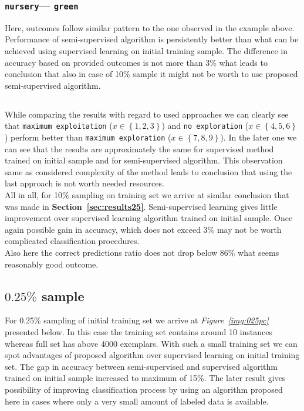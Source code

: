 \documentclass[12pt, a4paper, pdflatex]{report}
\begin{document}
\subsubsection{\texttt{nursery}--- \texttt{green}}
Here, outcomes follow similar pattern to the one observed in the example above. Performance of semi-supervised algorithm is persistently better than what can be achieved using supervised learning on initial training sample. The difference in accuracy based on provided outcomes is not more than 3\% what leads to conclusion that also in case of 10\% sample it might not be worth to use proposed semi-supervised algorithm.

\subsection*{}
While comparing the results with regard to used approaches we can clearly see that \texttt{maximum exploitation} ($x \in \left \{ 1, 2, 3 \right \}$) and \texttt{no exploration} ($x \in \left \{ 4, 5, 6 \right \}$) perform better than \texttt{maximum exploration} ($x \in \left \{ 7, 8, 9 \right \}$). In the later one we can see that the results are approximately the same for supervised method trained on initial sample and for semi-supervised algorithm. This observation same as considered complexity of the method leads to conclusion that using the last approach is not worth needed resources.\\

All in all, for 10\% sampling on training set we arrive at similar conclusion that was made in \textbf{Section~\ref{sec:results25}}. Semi-supervised learning gives little improvement over supervised learning algorithm trained on initial sample. Once again possible gain in accuracy, which does not exceed 3\% may not be worth complicated classification procedures.\\
Also here the correct predictions ratio does not drop below 86\% what seems reasonably good outcome.


\subsection{$\mathbf{0.25\%}$ sample~\cite{results025}\label{sec:results025}}
For 0.25\% sampling of initial training set we arrive at \emph{Figure~\ref{img:025pc}} presented below. In this case the training set contains around 10 instances whereas full set has above 4000 exemplars. With such a small training set we can spot advantages of proposed algorithm over supervised learning on initial training set. The gap in accuracy between semi-supervised and supervised algorithm trained on initial sample increased to maximum of 15\%. The later result gives possibility of improving classification process by using an algorithm proposed here in cases where only a very small amount of labeled data is available.
\end{document}
